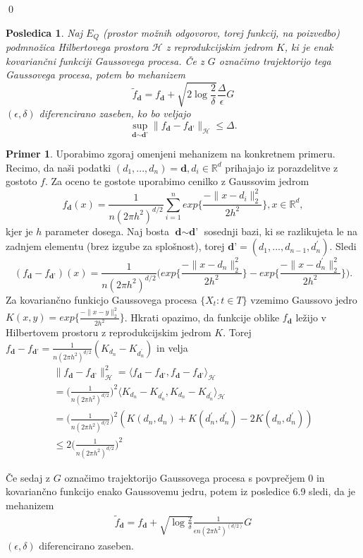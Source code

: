 \documentclass[12pt,a4paper]{amsart}
\theoremstyle{definition} %
\newtheorem{primer}[definicija]{Primer}
\theoremstyle{plain} %
\newtheorem{posledica}[definicija]{Posledica}
\begin{document}
\qed
\begin{posledica}
Naj $E_Q$ (prostor možnih odgovorov, torej funkcij, na poizvedbo) podmnožica Hilbertovega prostora $\mathcal{H}$ z reprodukcijskim jedrom $K$, ki je enak kovariančni funkciji Gaussovega procesa. Če z $G$ označimo trajektorijo tega Gaussovega procesa, potem bo mehanizem 
$$
\widetilde{f}_{\textbf{d}} = f_{\textbf{d}} + \sqrt{2\log{\frac{2}{\delta}}} \frac{\Delta}{\epsilon}G
$$
$(\epsilon,\delta)$ diferencirano zaseben, ko bo veljajo 
$$
\sup_{\textbf{d} \sim \textbf{d'}} \| f_{\textbf{d}} -  f_{\textbf{d'}} \|_{\mathcal{H}} \leq \Delta.
$$
\end{posledica}
 
\begin{primer}
Uporabimo zgoraj omenjeni mehanizem na konkretnem primeru. Recimo, da naši podatki $(d_1,...,d_n) = \textbf{d}, d_i \in \mathbb{R}^d$ prihajajo iz porazdelitve z gostoto $f$. Za oceno te gostote uporabimo cenilko z Gaussovim jedrom
$$
f_{\textbf{d}}(x) = \frac{1}{n(2\pi h^2)^{d/2}} \sum_{i=1}^{n} exp\Big\{\frac{-\|x-d_i\|_{2}^{2}}{2h^2}\Big\},  x \in \mathbb{R}^d,
$$
kjer je $h$ parameter dosega. Naj bosta $\textbf{d} \sim \textbf{d'}$ sosednji bazi, ki se razlikujeta le na zadnjem elementu (brez izgube za splošnost), torej $\textbf{d'} = (d_1,...,d_{n-1},d_{n}^{\prime}) $. Sledi
$$
(f_{\textbf{d}} - f_{\textbf{d'}})(x) = \frac{1}{n(2\pi h^2)^{d/2}} \Big(exp\Big\{\frac{-\|x-d_n\|_{2}^{2}}{2h^2}\Big\}-exp\Big\{\frac{-\|x-d_{n}^{\prime}\|_{2}^{2}}{2h^2}\Big\}\Big).
$$
Za kovariančno funkicjo Gaussovega procesa $\{X_t : t \in T \}$ vzemimo Gaussovo jedro $K(x,y) = exp\{\frac{-\|x-y\|_{2}^{2}}{2h^2}\}$. Hkrati opazimo, da funkcije oblike $f_{\textbf{d}}$ ležijo v Hilbertovem prostoru z reprodukcijskim jedrom $K$. Torej $f_{\textbf{d}} - f_{\textbf{d'}} = \frac{1}{n(2\pi h^2)^{d/2}} (K_{d_n}-K_{d_{n}^{\prime}})$ in velja 
\begin{gather*}
\|f_{\textbf{d}} - f_{\textbf{d'}}\|_{\mathcal{H}}^{2} = \langle f_{\textbf{d}} - f_{\textbf{d'}}, f_{\textbf{d}} - f_{\textbf{d'}} \rangle_{\mathcal{H}}  \\ 
= \Big(\frac{1}{n(2\pi h^2)^{d/2}}\Big)^2 \langle K_{d_n}-K_{d_{n}^{\prime}}, K_{d_n}-K_{d_{n}^{\prime}} \rangle_{\mathcal{H}}  \\
= \Big(\frac{1}{n(2\pi h^2)^{d/2}}\Big)^2 (K(d_n, d_n)+K(d_{n}^{\prime}, d_{n}^{\prime})-2K(d_n, d_{n}^{\prime})) \\ 
\leq 2 \Big(\frac{1}{n(2\pi h^2)^{d/2}}\Big)^2
\end{gather*}

Če sedaj z $G$ označimo trajektorijo Gaussovega procesa s povprečjem 0 in kovariančno funkcijo enako Gaussovemu jedru, potem iz posledice 6.9 sledi, da je mehanizem 
\begin{gather*}
\widetilde{f}_{\textbf{d}} = f_{\textbf{d}} + \sqrt{\log{\frac{2}{\delta}}} \frac{1}{\epsilon n (2\pi h^2)^{(d/2)}}G
\end{gather*}
$(\epsilon, \delta)$ diferencirano zaseben.
\end{primer}
\end{document}
